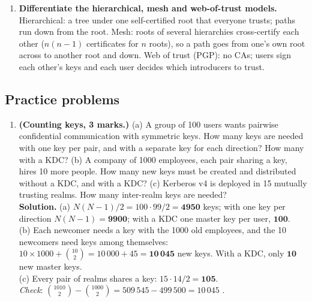 \begin{enumerate}[leftmargin=1.6em,itemsep=3pt]
  \item \textbf{Differentiate the hierarchical, mesh and web-of-trust models.} Hierarchical: a tree under one self-certified root that everyone trusts; paths run down from the root. Mesh: roots of several hierarchies cross-certify each other ($n(n-1)$ certificates for $n$ roots), so a path goes from one's own root across to another root and down. Web of trust (PGP): no CAs; users sign each other's keys and each user decides which introducers to trust.
\end{enumerate}

\subsection*{Practice problems}
\begin{enumerate}[leftmargin=1.6em,itemsep=4pt]
  \item \textbf{(Counting keys, 3 marks.)} (a) A group of 100 users wants pairwise confidential communication with symmetric keys. How many keys are needed with one key per pair, and with a separate key for each direction? How many with a KDC? (b) A company of 1000 employees, each pair sharing a key, hires 10 more people. How many new keys must be created and distributed without a KDC, and with a KDC? (c) Kerberos v4 is deployed in 15 mutually trusting realms. How many inter-realm keys are needed?\\
  \textbf{Solution.} (a) $N(N-1)/2 = 100 \cdot 99/2 = \mathbf{4950}$ keys; with one key per direction $N(N-1) = \mathbf{9900}$; with a KDC one master key per user, $\mathbf{100}$.\\
  (b) Each newcomer needs a key with the 1000 old employees, and the 10 newcomers need keys among themselves: $10 \times 1000 + \binom{10}{2} = 10\,000 + 45 = \mathbf{10\,045}$ new keys. With a KDC, only $\mathbf{10}$ new master keys.\\
  (c) Every pair of realms shares a key: $15 \cdot 14/2 = \mathbf{105}$.\\
  \emph{Check}: $\binom{1010}{2} - \binom{1000}{2} = 509\,545 - 499\,500 = 10\,045$ \checkmark.


\end{enumerate}
